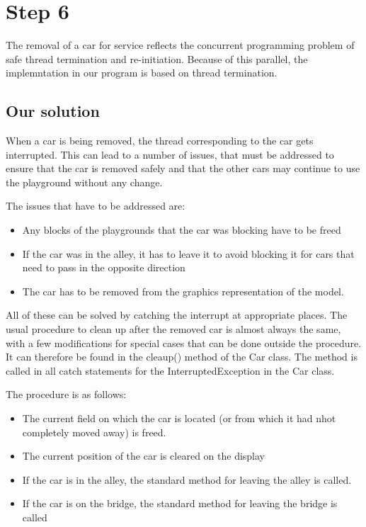 
\section{Step 6} %

The removal of a car for service reflects the concurrent programming problem of safe thread termination and re-initiation. Because of this parallel, the implemntation in our program is based on thread termination.
\subsection{Our solution}
When a car is being removed, the thread corresponding to the car gets interrupted. This can lead to a number of issues, that must be addressed to ensure that the car is removed safely and that the other cars may continue to use the playground without any change.

The issues that have to be addressed are:
\begin{itemize}
 \item Any blocks of the playgrounds that the car was blocking have to be freed
 \item If the car was in the alley, it has to leave it to avoid blocking it for cars that need to pass in the opposite direction
 \item The car has to be removed from the graphics representation of the model.
\end{itemize}

All of these can be solved by catching the interrupt at appropriate places. The usual procedure to clean up after the removed car is almost always the same, with a few modifications for special cases that can be done outside the procedure. It can therefore be found in the cleaup() method of the Car class. The method is called in all catch statements for the InterruptedException in the Car class. 

The procedure is as follows:
\begin{itemize}
 \item The current field on which the car is located (or from which it had nhot completely moved away) is freed.
 \item The current position of the car is cleared on the display
 \item If the car is in the alley, the standard method for leaving the alley is called.
 \item If the car is on the bridge, the standard method for leaving the bridge is called
\end{itemize}

